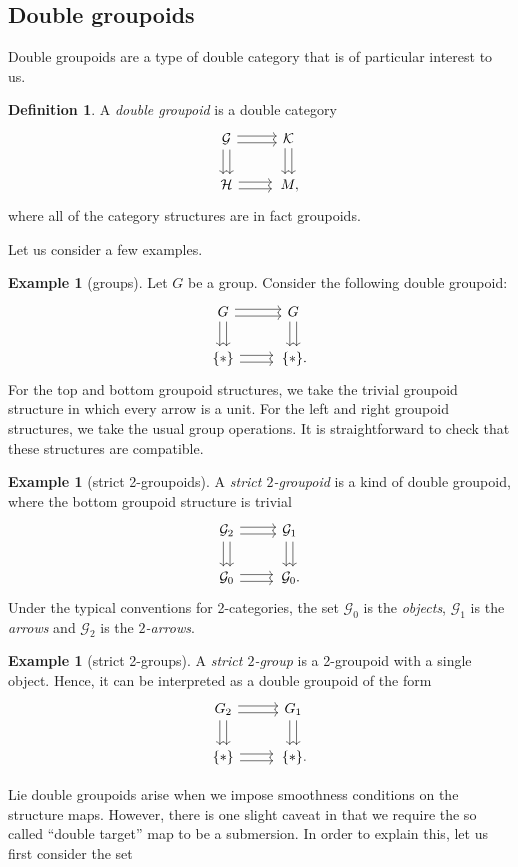 \documentclass[10pt,a4paper]{amsart}
\numberwithin{equation}{section}
\theoremstyle{definition}
\newtheorem{Definition}[Theorem]{Definition}
\newtheorem{Example}[Theorem]{Example}
\newcommand{\CG}{\mathcal{G}}
\newcommand{\CH}{\mathcal{H}}
\newcommand{\CK}{\mathcal{K}}
\newcommand{\darrow}{\arrow[d, shift right] \arrow[d, shift left]}
\newcommand{\rarrow}{\arrow[r, shift right] \arrow[r, shift left]}
\begin{document}
\subsection{Double groupoids}
Double groupoids are a type of double category that is of particular interest to us.
\begin{Definition}
A \emph{double groupoid} is a double category
 \[\begin{tikzcd}
\CG \darrow \rarrow & \CK \darrow \\
\CH \rarrow & \,M,
\end{tikzcd}
\]
where all of the category structures are in fact groupoids.
\end{Definition}
Let us consider a few examples.
\begin{Example}[groups]
  Let $ G $ be a group. Consider the following double groupoid:
\[\begin{tikzcd}
G \darrow \rarrow & G \darrow \\
\{*\} \rarrow & \,\{*\}.
\end{tikzcd}
\]
For the top and bottom groupoid structures, we take the trivial groupoid structure in which every arrow is a unit. For the left and right groupoid structures, we take the usual group operations. It is straightforward to check that these structures are compatible.
\end{Example}
\begin{Example}[strict 2-groupoids]
A \emph{strict $2$-groupoid} is a kind of double groupoid, where the bottom groupoid structure is trivial
\[
\begin{tikzcd}
  \CG_2 \darrow \rarrow & \CG_1 \darrow \\
\CG_0 \rarrow & \,\CG_0.
\end{tikzcd}
\]
Under the typical conventions for 2-categories, the set $ \CG_0 $ is the \emph{objects}, $ \CG_1$ is the \emph{arrows} and $ \CG_2$ is the \emph{$2$-arrows}.
\end{Example}
\begin{Example}[strict 2-groups]
A \emph{strict $2$-group} is a 2-groupoid with a single object. Hence, it can be interpreted as a double groupoid of the form
\[
\begin{tikzcd}
  G_2 \darrow \rarrow & G_1 \darrow \\
\{ * \} \rarrow &\, \{ * \}.
\end{tikzcd}
\]

\end{Example}
Lie double groupoids arise when we impose smoothness conditions on the structure maps. However, there is one slight caveat in that we require the so called ``double target'' map to be a submersion. In order to explain this, let us first consider the set
\end{document}
